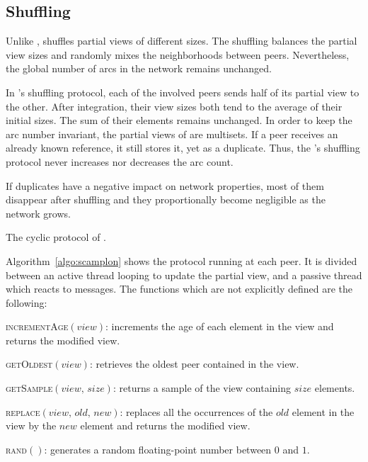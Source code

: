 \subsection{Shuffling}
\label{subsec:cyclic}

Unlike \CYCLON, \SPRAY shuffles partial views of different sizes. The
shuffling balances the partial view sizes and randomly mixes the
neighborhoods between peers. Nevertheless, the global number of arcs
in the network remains unchanged.

In \SPRAY's shuffling protocol, each of the involved peers sends half of its
partial view to the other. After integration, their view sizes both tend to the
average of their initial sizes. The sum of their elements remains unchanged. In
order to keep the arc number invariant, the partial views of \SPRAY are
multisets. If a peer receives an already known reference, it still stores it,
yet as a duplicate. Thus, the \SPRAY's shuffling protocol never increases nor
decreases the arc count.

If duplicates have a negative impact on network properties, most of
them disappear after shuffling and they proportionally become
negligible as the network grows.

\begin{algorithm}[h]
  
  \caption{\label{algo:scamplon}The cyclic protocol of \SPRAY.}
\end{algorithm}

Algorithm~\ref{algo:scamplon} shows the \SPRAY protocol running at
each peer. It is divided between an active thread looping to update
the partial view, and a passive thread which reacts to messages. The
functions which are not explicitly defined are the following:
\begin{compactitem}
\item \textsc{incrementAge}$(view)$: increments the age of each element in the view
  and returns the modified view.
\item \textsc{getOldest}$(view)$: retrieves the oldest peer contained in the view.
\item \textsc{getSample}$(view, \, size)$: returns a sample of the view containing
  $size$ elements.
\item \textsc{replace}$(view,\,old,\,new)$: replaces all the occurrences of the
  $old$ element in the view by the $new$ element and returns the
  modified view.
\item \textsc{rand}$()$: generates a random floating-point number between $0$
  and $1$.
\end{compactitem}

